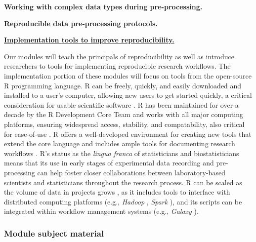 \documentclass[pdftex,english,11pt,parskip=half]{scrartcl}
\begin{document}
\textbf{Working with complex data types during pre-processing.}

\textbf{Reproducible data pre-processing protocols.}

\underline{\textbf{Implementation tools to improve reproducibility.}}

Our modules will teach the principals of reproducibility as well as introduce researchers to tools for implementing reproducible research workflows. The implementation portion of these modules will focus on tools from the open-source R programming language. R can be freely, quickly, and easily downloaded and installed to a user's computer, allowing new users to get started quickly, a critical consideration for usable scientific software \cite{list2017ten}. R has been maintained for over a decade by the R Development Core Team and works with all major computing platforms, ensuring  widespread access, stability, and compatability, also critical for ease-of-use \cite{baumer2017lessons, altschul2013anatomy}. R offers a well-developed environment for creating new tools that extend the core language \cite{wickham2015r} and includes ample tools for documenting research workflows \cite{xie2015dynamic, xie2016bookdown}. R's status as the \textit{lingua franca} of statisticians and biostatisticians means that its use in early stages of experimental data recording and pre-processing can help foster closer collaborations between laboratory-based scientists and statisticians throughout the research process. R can be scaled as the volume of data in projects grows \cite{list2017ten}, as it includes tools to interface with distributed computing platforms (e.g., \textit{Hadoop} \cite{pathak2014rhadoop}, \textit{Spark} \cite{sparklyr}), and its scripts can be integrated within workflow management systems (e.g., \textit{Galaxy} \cite{goecks2010galaxy, walker2016models}). 

\subsubsection*{Module subject material}
\end{document}
